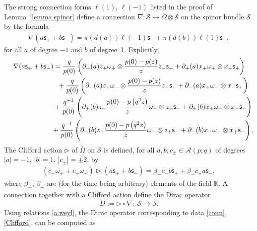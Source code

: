 \documentclass[10pt,a4paper]{amsart}
\numberwithin{equation}{section}
\def\AWeyl#1#2{{\mathcal{A}}(#1;#2)}
\begin{document}
The strong connection forms $\ell(1)$, $\ell(-1)$ listed in the proof of Lemma~\ref{lemma.spinor} def\/ine a connection $\nabla\colon \mathcal{S} \to \bar\Omega \otimes \mathcal{S}$ on the spinor bundle $\mathcal{S}$ by the formula
\begin{gather*}
\nabla(a {\mathsf{s}}_+ + b {\mathsf{s}}_-) = \pi(d(a))\ell(-1) {\mathsf{s}}_+ + \pi(d(b))\ell(1) {\mathsf{s}}_-,
\end{gather*}
for all $a$ of degree $-1$ and $b$ of degree~1. Explicitly,
\begin{gather}
\nabla(a {\mathsf{s}}_+ + b {\mathsf{s}}_-) = \frac{q}{p(0)} \left(\partial_+(a){z_+}\omega_+ \otimes \frac{p(0) - p(z)}{z} z_-{\mathsf{s}}_+ + \partial_+(a)x_+\omega_+\otimes x_-{\mathsf{s}}_+ \right)\nonumber \\
\hphantom{\nabla(a {\mathsf{s}}_+ + b {\mathsf{s}}_-) =}{} + \frac{q}{p(0)} \left(\partial_-(a){z_+}\omega_- \otimes \frac{p(0) - p(z)}{z} z_-{\mathsf{s}}_+ + \partial_-(a)x_+\omega_-\otimes x_-{\mathsf{s}}_+ \right)\nonumber \\
 \hphantom{\nabla(a {\mathsf{s}}_+ + b {\mathsf{s}}_-) =}{}+ \frac{q^{-1}}{p(0)} \left(\partial_+(b){z_-}\frac{p(0) - p\left(q^2z\right)}{z} \omega_+ \otimes z_+{\mathsf{s}}_- + \partial_+(b)x_+\omega_+\otimes x_+{\mathsf{s}}_- \right)\nonumber \\
\hphantom{\nabla(a {\mathsf{s}}_+ + b {\mathsf{s}}_-) =}{} + \frac{q^{-1}}{p(0)} \left(\partial_-(b){z_-}\frac{p(0) - p\left(q^2z\right)}{z} \omega_- \otimes z_+{\mathsf{s}}_- + \partial_-(b)x_+\omega_-\otimes x_+{\mathsf{s}}_- \right) .\label{conn}
\end{gather}
The Clif\/ford action $\triangleright$ of $\bar\Omega$ on $\mathcal{S}$ is def\/ined, for all $a,b,c_\pm \in \AWeyl p q$ of degrees $|a| = -1$, $|b| =1$, $|c_\pm| = \pm 2$, by
\begin{gather}\label{Clifford}
(c_-\omega_+ + c_+\omega_-)\triangleright (a {\mathsf{s}}_+ + b {\mathsf{s}}_-) = \beta_+ c_-b {\mathsf{s}}_+ + \beta_- c_+a {\mathsf{s}}_-,
\end{gather}
where $\beta_+$, $\beta_-$ are (for the time being arbitrary) elements of the f\/ield ${\mathbb K}$. A connection together with a Clif\/ford action def\/ine the Dirac operator
\begin{gather*}
D := \triangleright \circ \nabla \colon \ \mathcal{S} \to \mathcal{S}.
\end{gather*}
Using relations \eqref{a.weyl}, the Dirac operator corresponding to data \eqref{conn}, \eqref{Clifford}, can be computed as
\end{document}
